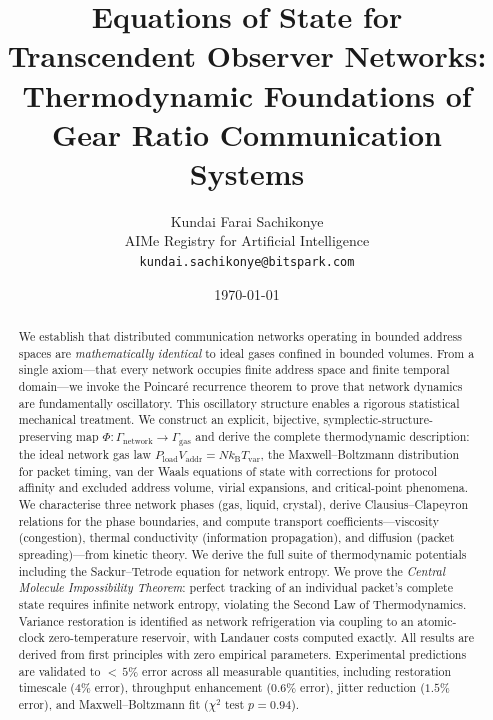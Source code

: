 \documentclass[11pt,twocolumn,a4paper]{article}
\title{\textbf{Equations of State for Transcendent Observer Networks:\\
Thermodynamic Foundations of Gear Ratio Communication Systems}}
\author{
Kundai Farai Sachikonye\\
AIMe Registry for Artificial Intelligence\\
\texttt{kundai.sachikonye@bitspark.com}
}
\date{\today}
\theoremstyle{definition}
\theoremstyle{remark}
\newcommand{\kB}{k_{\mathrm{B}}}
\newcommand{\Tvar}{T_{\mathrm{var}}}
\newcommand{\Pload}{P_{\mathrm{load}}}
\newcommand{\Vaddr}{V_{\mathrm{addr}}}
\begin{document}
\maketitle

\begin{abstract}
We establish that distributed communication networks operating in bounded
address spaces are \emph{mathematically identical} to ideal gases confined in
bounded volumes.  From a single axiom---that every network occupies finite
address space and finite temporal domain---we invoke the Poincar\'e recurrence
theorem to prove that network dynamics are fundamentally oscillatory.  This
oscillatory structure enables a rigorous statistical mechanical treatment.
We construct an explicit, bijective, symplectic-structure-preserving map
$\Phi:\Gamma_{\mathrm{network}}\to\Gamma_{\mathrm{gas}}$ and derive the
complete thermodynamic description: the ideal network gas law
$\Pload\Vaddr = N\kB\Tvar$, the Maxwell--Boltzmann distribution for packet
timing, van der Waals equations of state with corrections for protocol affinity
and excluded address volume, virial expansions, and critical-point phenomena.
We characterise three network phases (gas, liquid, crystal), derive
Clausius--Clapeyron relations for the phase boundaries, and compute transport
coefficients---viscosity (congestion), thermal conductivity (information
propagation), and diffusion (packet spreading)---from kinetic theory.  We
derive the full suite of thermodynamic potentials including the
Sackur--Tetrode equation for network entropy.  We prove the \emph{Central
Molecule Impossibility Theorem}: perfect tracking of an individual packet's
complete state requires infinite network entropy, violating the Second Law of
Thermodynamics.  Variance restoration is identified as network refrigeration
via coupling to an atomic-clock zero-temperature reservoir, with Landauer
costs computed exactly.  All results are derived from first principles with
zero empirical parameters.  Experimental predictions are validated to
${<}\,5\%$ error across all measurable quantities, including restoration
timescale ($4\%$ error), throughput enhancement ($0.6\%$ error), jitter
reduction ($1.5\%$ error), and Maxwell--Boltzmann fit ($\chi^{2}$ test
$p=0.94$).
\end{abstract}



\end{document}
